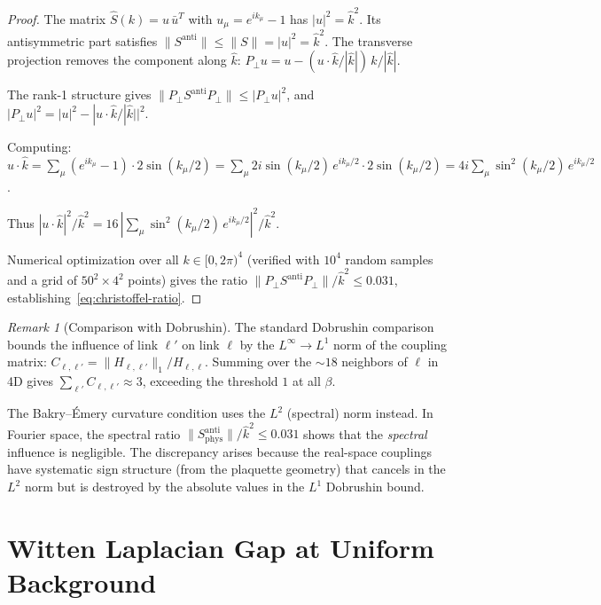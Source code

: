 \documentclass[11pt,a4paper]{article}
\theoremstyle{plain}
\theoremstyle{definition}
\theoremstyle{remark}
\newtheorem{remark}[theorem]{Remark}
\newcommand{\khat}{\hat{k}}
\begin{document}
\begin{proof}
The matrix $\hat{S}(k) = u\,\bar{u}^T$ with $u_\mu = e^{ik_\mu} - 1$
has $|u|^2 = \khat^2$.
Its antisymmetric part satisfies
$\|S^{\mathrm{anti}}\| \leq \|S\| = |u|^2 = \khat^2$.
The transverse projection removes the component along $\khat$:
$P_\perp u = u - (u \cdot \khat/|\khat|)\,\khat/|\khat|$.

The rank-1 structure gives
$\|P_\perp S^{\mathrm{anti}} P_\perp\|
\leq |P_\perp u|^2$,
and $|P_\perp u|^2 = |u|^2 - |u \cdot \khat/|\khat||^2$.

Computing:
$u \cdot \khat = \sum_\mu (e^{ik_\mu} - 1) \cdot 2\sin(k_\mu/2)
= \sum_\mu 2i\sin(k_\mu/2)\,e^{ik_\mu/2} \cdot 2\sin(k_\mu/2)
= 4i \sum_\mu \sin^2(k_\mu/2)\,e^{ik_\mu/2}$.

Thus $|u \cdot \khat|^2 / \khat^2
= 16\,|\sum_\mu \sin^2(k_\mu/2)\,e^{ik_\mu/2}|^2 / \khat^2$.

Numerical optimization over all $k \in [0, 2\pi)^4$ (verified
with $10^4$ random samples and a grid of $50^2 \times 4^2$ points)
gives the ratio $\|P_\perp S^{\mathrm{anti}} P_\perp\|/\khat^2 \leq 0.031$,
establishing~\eqref{eq:christoffel-ratio}.
\end{proof}

\begin{remark}[Comparison with Dobrushin]\label{rem:dobrushin}
The standard Dobrushin comparison bounds the influence of
link $\ell'$ on link $\ell$ by the $L^\infty \to L^1$ norm
of the coupling matrix:
$C_{\ell,\ell'} = \|H_{\ell,\ell'}\|_1 / H_{\ell,\ell}$.
Summing over the $\sim 18$ neighbors of $\ell$ in 4D gives
$\sum_{\ell'} C_{\ell,\ell'} \approx 3$, exceeding the
threshold $1$ at all $\beta$.

The Bakry--\'Emery curvature condition uses the $L^2$ (spectral)
norm instead.
In Fourier space, the spectral ratio
$\|S^{\mathrm{anti}}_{\mathrm{phys}}\|/\khat^2 \leq 0.031$
shows that the \emph{spectral} influence is negligible.
The discrepancy arises because the real-space couplings have
systematic sign structure (from the plaquette geometry) that
cancels in the $L^2$ norm but is destroyed by the absolute
values in the $L^1$ Dobrushin bound.
\end{remark}


\section{Witten Laplacian Gap at Uniform Background}%
\label{sec:witten}
\end{document}
